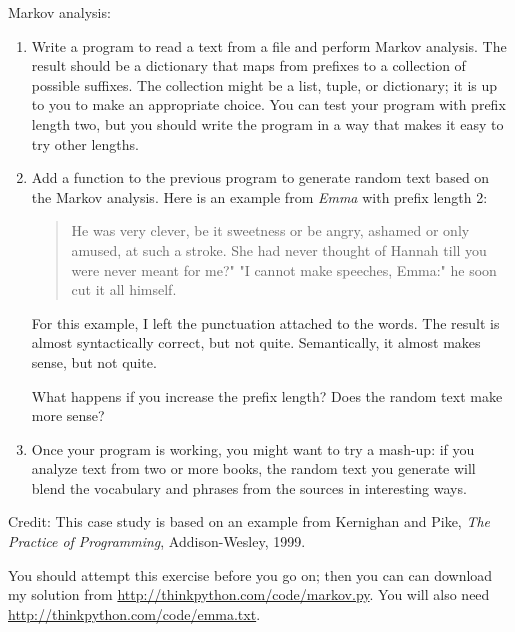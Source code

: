 \documentclass[10pt]{book}
\begin{document}
\begin{exercise}

Markov analysis:

\begin{enumerate}

\item Write a program to read a text from a file and perform Markov
analysis.  The result should be a dictionary that maps from
prefixes to a collection of possible suffixes.  The collection
might be a list, tuple, or dictionary; it is up to you to make
an appropriate choice.  You can test your program with prefix
length two, but you should write the program in a way that makes
it easy to try other lengths.

\item Add a function to the previous program to generate random text
based on the Markov analysis.  Here is an example from {\em Emma}
with prefix length 2:

\begin{quote}
He was very clever, be it sweetness or be angry, ashamed or only
amused, at such a stroke. She had never thought of Hannah till you
were never meant for me?" "I cannot make speeches, Emma:" he soon cut
it all himself.
\end{quote}

For this example, I left the punctuation attached to the words.
The result is almost syntactically correct, but not quite.
Semantically, it almost makes sense, but not quite.

What happens if you increase the prefix length?  Does the random
text make more sense?

\item Once your program is working, you might want to try a mash-up:
if you analyze text from two or more books, the random
text you generate will blend the vocabulary and phrases from
the sources in interesting ways.

\end{enumerate}

Credit: This case study is based on an example from Kernighan and
Pike, {\em The Practice of Programming}, Addison-Wesley, 1999.

\end{exercise}

You should attempt this exercise before you go on; then you can can
download my solution from \url{http://thinkpython.com/code/markov.py}.  You
will also need \url{http://thinkpython.com/code/emma.txt}.
\end{document}
